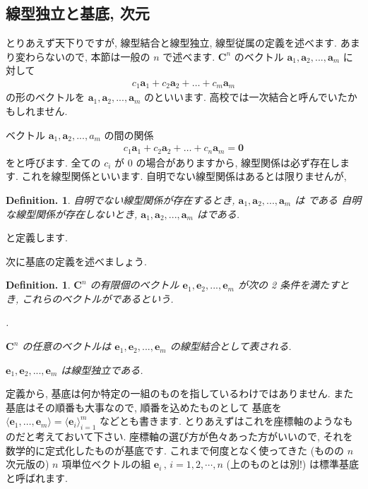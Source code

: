 \documentclass[openany, a4paper, oneside]{jsbook}
\newcounter{enum2}
\renewenvironment{enumerate}{%
\begin{list}%
{%
\arabic{enum2}.\ \,%
}%
{%
\usecounter{enum2}
\setlength{\itemindent}{0pt}%
\setlength{\leftmargin}{15pt}%
\setlength{\rightmargin}{0pt}%
\setlength{\labelsep}{0pt}%
\setlength{\labelwidth}{6pt}%
\setlength{\itemsep}{0pt}%
\setlength{\parsep}{0pt}%
\setlength{\listparindent}{0pt}%
}
}{%
\end{list}%
}
\theoremstyle{break}
\theoremstyle{breakdefn}
\newtheorem{defn}[thm]{Definition.}
\begin{document}
\subsection{線型独立と基底, 次元 \label{sec:basis}}


とりあえず天下りですが, 線型結合と線型独立, 線型従属の定義を述べます.
あまり変わらないので, 本節は一般の $n$ で述べます.
 $\bm{C}^n$ のベクトル $\bm{a}_{1},\bm{a}_{2},...,\bm{a}_{m}$ に対して
    \begin{align}
        c_{1}\bm{a}_{1} + c_{2}\bm{a}_{2} + \dots + c_{m}\bm{a}_{m}
    \end{align}
の形のベクトルを $\bm{a}_{1},\bm{a}_{2},...,\bm{a}_{m}$ のといいます.
高校では一次結合と呼んでいたかもしれません.

ベクトル $\bm{a}_{1},\bm{a}_{2},...,{a}_{m}$ の間の関係
    \begin{align}
        c_{1}\bm{a}_{1} + c_{2}\bm{a}_{2} + \dots + c_{n}\bm{a}_{m} = \bm{0}
    \end{align}
をと呼びます. 全ての $c_{i}$ が $0$ の場合がありますから, 線型関係は必ず存在します.
これを線型関係といいます.
自明でない線型関係はあるとは限りませんが,
    \begin{defn}自明でない線型関係が存在するとき,  $\bm{a}_{1},\bm{a}_{2},...,\bm{a}_{m}$ は
である
自明な線型関係が存在しないとき,  $\bm{a}_{1},\bm{a}_{2},...,\bm{a}_{m}$ はである.
    \end{defn}
と定義します.

次に基底の定義を述べましょう.
    \begin{defn} $\bm{C}^n$ の有限個のベクトル $\bm{e}_{1},\bm{e}_{2},...,\bm{e}_{m}$ が次の 2 条件を満たすとき,
これらのベクトルがであるという.
    \begin{enumerate}
        \item  $\bm{C}^n$ の任意のベクトルは $\bm{e}_{1},\bm{e}_{2},...,\bm{e}_{m}$ の線型結合として表される.
        \item  $\bm{e}_{1},\bm{e}_{2},...,\bm{e}_m$ は線型独立である.
    \end{enumerate}
    \end{defn}
定義から, 基底は何か特定の一組のものを指しているわけではありません.
また基底はその順番も大事なので, 順番を込めたものとして
基底を $\langle \bm{e}_1,\dots,\bm{e}_{m} \rangle = \langle \bm{e}_{i} \rangle _{i=1}^m$ などとも書きます.
とりあえずはこれを座標軸のようなものだと考えておいて下さい.
座標軸の選び方が色々あった方がいいので, それを数学的に定式化したものが基底です.
これまで何度となく使ってきた (ものの $n$ 次元版の) $n$ 項単位ベクトルの組
 $\bm{e}_{i} \, , \, i=1,2,\dotsb,n$ (上のものとは別!) は標準基底と呼ばれます.
\end{document}
